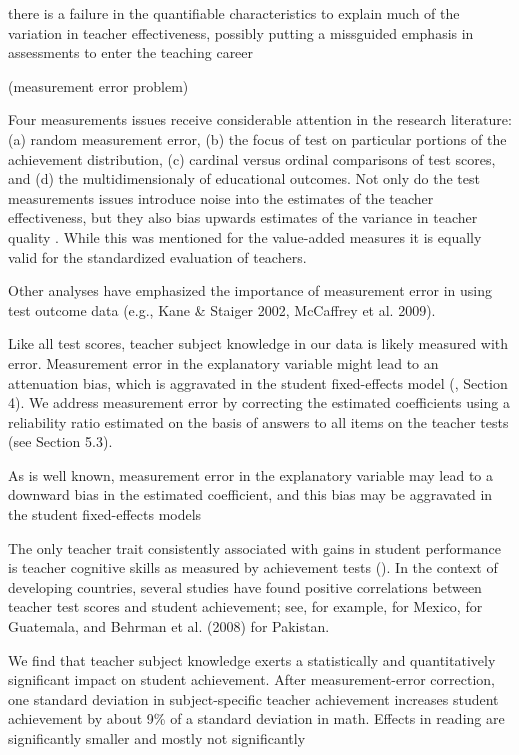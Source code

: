 \citet{Hanushek_et_al_2012} there is a failure in the quantifiable characteristics to explain much of the variation in teacher effectiveness, possibly putting a missguided emphasis in assessments to enter the teaching career


 (measurement error problem)


Four measurements issues receive considerable attention in the research literature: (a) random measurement error, (b) the focus of test on particular portions of the achievement distribution, (c) cardinal versus ordinal comparisons of test scores, and (d) the multidimensionaly of educational outcomes. Not only do the test measurements issues introduce noise into the estimates of the teacher effectiveness, but they also bias upwards estimates of the variance in teacher quality \citep{Hanushek_et_al_2012}. While this was mentioned for the value-added measures it is equally valid for the standardized evaluation of teachers.


Other analyses have emphasized the importance of measurement error in using test outcome data (e.g., Kane & Staiger 2002, McCaffrey et al. 2009).


Like all test scores, teacher subject knowledge in our data is likely measured with error. Measurement error in the explanatory variable might lead to an attenuation bias, which is aggravated in the student fixed-effects model (\citep{Angrist_et_al_1999}, Section 4). We address measurement error by correcting the estimated coefficients using a reliability ratio estimated on the basis of answers to all items on the teacher tests (see Section 5.3).


As is well known, measurement error in the explanatory variable may lead to a downward bias in the estimated coefficient, and this bias may be aggravated in the student fixed-effects models \citep{Angrist_et_al_1999}


The only teacher trait consistently associated with gains in student performance is teacher cognitive skills as measured by achievement tests (\citep{Hanushek_et_al_2006, Rockoff_et_al_2011}). In the context of developing countries, several studies have found positive correlations between teacher test scores and student achievement; see, for example, \citep{Santibanez_2006} for Mexico, \citep{Marshall_2009} for Guatemala, and Behrman et al. (2008) for Pakistan.


We find that teacher subject knowledge exerts a statistically and quantitatively significant impact on student achievement. After measurement-error correction, one standard deviation in subject-specific teacher achievement increases student achievement by about 9\% of a standard deviation in math. Effects in reading are significantly smaller and mostly not significantly \citep{Metzler_et_al_2012}



